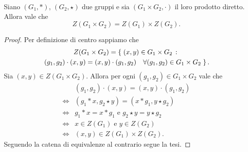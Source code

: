 \begin{proposition}
    Siano $(G_1, *)$, $(G_2, \star)$ due gruppi e sia $(G_1 \times G_2, \cdot)$ il loro prodotto diretto.
    Allora vale che \[
        Z(G_1 \times G_2) = Z(G_1) \times Z(G_2).
    \]
\end{proposition}
\begin{proof}
    Per definizione di centro sappiamo che \begin{multline*}
        Z(G_1 \times G_2) = \left\{\;(x, y) \in G_1 \times G_2 \,:\, \right. \\
        \left. (g_1, g_2) \cdot (x, y) = (x, y) \cdot (g_1, g_2) \quad \forall(g_1,g_2) \in G_1 \times G_2\;\right\}.  
    \end{multline*}
    Sia $(x, y) \in Z(G_1 \times G_2)$. Allora per ogni $ (g_1,g_2) \in G_1 \times G_2$ vale che \begin{align*}
        &(g_1, g_2) \cdot (x, y) = (x, y) \cdot (g_1, g_2) \\
        \iff &(g_1 * x, g_2 \star y) = (x * g_1, y \star g_2)\\
        \iff &g_1 * x = x*g_1 \text{ e } g_2 \star y = y \star g_2\\
        \iff &x \in Z(G_1) \text{ e } y \in Z(G_2)\\
        \iff &(x, y) \in Z(G_1) \times Z(G_2).
    \end{align*}
    Seguendo la catena di equivalenze al contrario segue la tesi.
\end{proof}